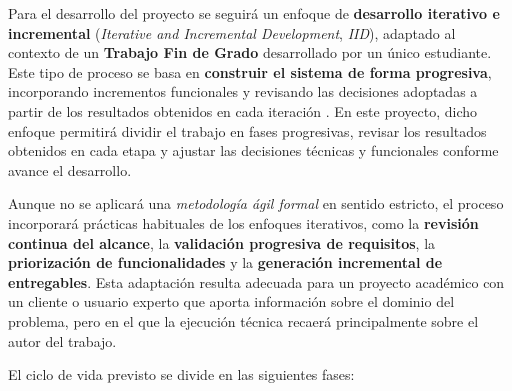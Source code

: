 Para el desarrollo del proyecto se seguirá un enfoque de \textbf{desarrollo iterativo e incremental} (\textit{Iterative and Incremental Development}, \textit{IID}), adaptado al contexto de un \textbf{Trabajo Fin de Grado} desarrollado por un único estudiante. Este tipo de proceso se basa en \textbf{construir el sistema de forma progresiva}, incorporando incrementos funcionales y revisando las decisiones adoptadas a partir de los resultados obtenidos en cada iteración \citep{larman2003iid}. En este proyecto, dicho enfoque permitirá dividir el trabajo en fases progresivas, revisar los resultados obtenidos en cada etapa y ajustar las decisiones técnicas y funcionales conforme avance el desarrollo.

Aunque no se aplicará una \textit{metodología ágil formal} en sentido estricto, el proceso incorporará prácticas habituales de los enfoques iterativos, como la \textbf{revisión continua del alcance}, la \textbf{validación progresiva de requisitos}, la \textbf{priorización de funcionalidades} y la \textbf{generación incremental de entregables}. Esta adaptación resulta adecuada para un proyecto académico con un cliente o usuario experto que aporta información sobre el dominio del problema, pero en el que la ejecución técnica recaerá principalmente sobre el autor del trabajo.

El ciclo de vida previsto se divide en las siguientes fases:


